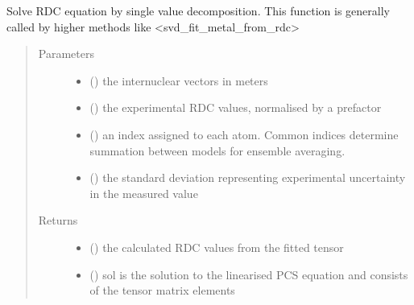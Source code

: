\documentclass[a4paper,10pt,english,openany,oneside]{sphinxmanual}
\begin{document}
\begin{fulllineitems}
\label{\detokenize{reference/generated/paramagpy.fit.svd_calc_metal_from_rdc:paramagpy.fit.svd_calc_metal_from_rdc}}
Solve RDC equation by single value decomposition.
This function is generally called by higher methods like
\textless{}svd\_fit\_metal\_from\_rdc\textgreater{}
\begin{quote}\begin{description}
\item[{Parameters}] \leavevmode\begin{itemize}
\item {} 
 (\sphinxstyleliteralemphasis{\sphinxupquote{ {[}}}\sphinxstyleliteralemphasis{\sphinxupquote{,}}\sphinxstyleliteralemphasis{\sphinxupquote{,}}\sphinxstyleliteralemphasis{\sphinxupquote{{]} }}) \textendash{} the internuclear vectors in meters

\item {} 
 () \textendash{} the experimental RDC values, normalised by a prefactor

\item {} 
 () \textendash{} an index assigned to each atom. Common indices determine summation
between models for ensemble averaging.

\item {} 
 () \textendash{} the standard deviation representing experimental uncertainty
in the measured value

\end{itemize}

\item[{Returns}] \leavevmode
\begin{itemize}
\item {} 
 () \textendash{} the calculated RDC values from the fitted tensor

\item {} 
 () \textendash{} sol is the solution to the linearised PCS equation and
consists of the tensor matrix elements

\end{itemize}


\end{description}\end{quote}

\end{fulllineitems}
\end{document}
